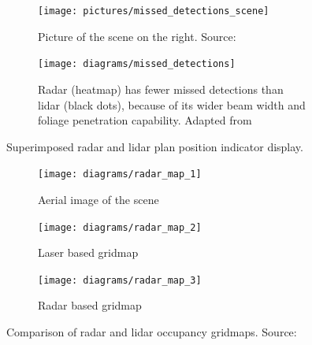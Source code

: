 \begin{figure}[htbp]
    \centering
    \begin{subfigure}[t]{0.45\textwidth}
        \texttt{[image: pictures/missed\_detections\_scene]}
        \caption{Picture of the scene on the right. Source: \cite{Jose2010}}
        \label{fig:missed_detections_scene}
    \end{subfigure}
    \hfill
    \begin{subfigure}[t]{0.45\textwidth}
        \texttt{[image: diagrams/missed\_detections]}
        \caption{Radar (heatmap) has fewer missed detections than lidar (black dots), because of its wider beam width and foliage penetration capability. Adapted from \cite{Adams2015}}
        \label{fig:missed_detections}
    \end{subfigure}
    \caption{Superimposed radar and lidar plan position indicator display.}
\end{figure}
\begin{figure}[htbp]
    \centering
    \begin{subfigure}[t]{0.32\textwidth}
        \texttt{[image: diagrams/radar\_map\_1]}
        \caption{Aerial image of the scene}
        \label{fig:radar_map_1}
    \end{subfigure}
    \hfill
    \begin{subfigure}[t]{0.32\textwidth}
        \texttt{[image: diagrams/radar\_map\_2]}
        \caption{Laser based gridmap}
        \label{fig:radar_map_2}
    \end{subfigure}
    \hfill
    \begin{subfigure}[t]{0.32\textwidth}
        \texttt{[image: diagrams/radar\_map\_3]}
        \caption{Radar based gridmap}
        \label{fig:radar_map_3}
    \end{subfigure}
    \caption{Comparison of radar and lidar occupancy gridmaps. Source: \cite{Adams2015}}
    \label{fig:radar_map}
\end{figure}
